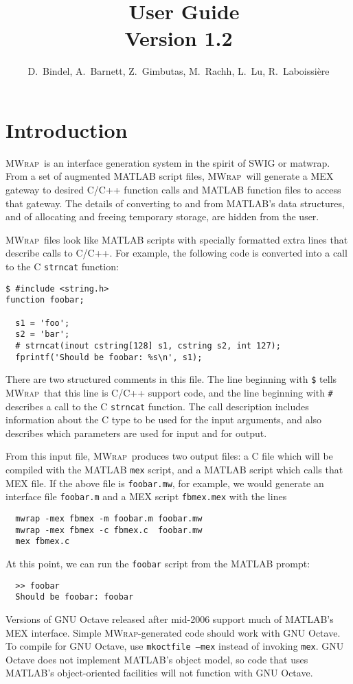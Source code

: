 \documentclass[12pt]{article}
\title{\mwrap\ User Guide\\ Version 1.2}
\author{D.~Bindel, A.~Barnett, Z.~Gimbutas, M.~Rachh, L.~Lu, R.~Laboissi\`ere}
\newcommand{\mwrap}{\textsc{MWrap}}
\begin{document}
\maketitle

\section{Introduction}

\mwrap\ is an interface generation system in the spirit of SWIG or
matwrap.  From a set of augmented MATLAB script files, \mwrap\ will
generate a MEX gateway to desired C/C++ function calls and MATLAB
function files to access that gateway.  The details of converting to
and from MATLAB's data structures, and of allocating and freeing
temporary storage, are hidden from the user.

\mwrap\ files look like MATLAB scripts with specially formatted
extra lines that describe calls to C/C++.  For example, the following
code is converted into a call to the C {\tt strncat} function:
\begin{verbatim}
$ #include <string.h>
function foobar;

  s1 = 'foo';
  s2 = 'bar';
  # strncat(inout cstring[128] s1, cstring s2, int 127);
  fprintf('Should be foobar: %s\n', s1);
\end{verbatim}
There are two structured comments in this file.  The line
beginning with \verb|$| tells \mwrap\ that this line is C/C++
support code, and the line beginning with \verb|#| describes
a call to the C {\tt strncat} function.  The call description
includes information about the C type to be used for the input
arguments, and also describes which parameters are used for input
and for output.

From this input file, \mwrap\ produces two output files: a C file
which will be compiled with the MATLAB {\tt mex} script, and a MATLAB
script which calls that MEX file.  If the above file is {\tt foobar.mw},
for example, we would generate an interface file {\tt foobar.m} and a
MEX script {\tt fbmex.mex} with the lines
\begin{verbatim}
  mwrap -mex fbmex -m foobar.m foobar.mw
  mwrap -mex fbmex -c fbmex.c  foobar.mw
  mex fbmex.c
\end{verbatim}
At this point, we can run the {\tt foobar} script from the MATLAB prompt:
\begin{verbatim}
  >> foobar
  Should be foobar: foobar
\end{verbatim}

Versions of GNU Octave released after mid-2006 support much of
MATLAB's MEX interface.  Simple {\mwrap}-generated code should work
with GNU Octave.  To compile for GNU Octave, use \texttt{mkoctfile
  --mex} instead of invoking \texttt{mex}.  GNU Octave does not
implement MATLAB's object model, so code that uses MATLAB's
object-oriented facilities will not function with GNU Octave.
\end{document}
